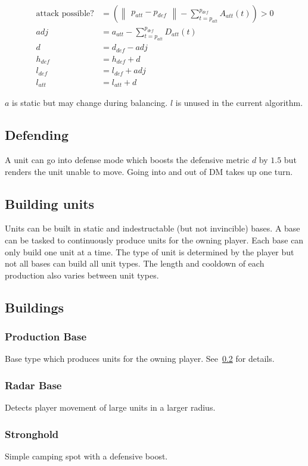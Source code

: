 \begin{align}
    \text{attack possible?} &= (\begin{Vmatrix}p_{att} - p_{def}\end{Vmatrix} - \sum_{t=p_{att}}^{p_{def}} A_{att}(t)) > 0 \\
    adj &= a_{att} - \sum_{t=p_{att}}^{p_{def}} D_{att}(t) \\
    d &= d_{def} - adj \\
    h_{def} &= h_{def} + d \\
    l_{def} &= l_{def} + adj \\
    l_{att} &= l_{att} + d
\end{align}

$a$ is static but may change during balancing. $l$ is unused in the current algorithm.
\subsection{Defending}
A unit  can go into defense mode which boosts the defensive metric $d$ by $1.5$ but renders the unit  unable to move.
Going into and out of DM takes up one turn.
\subsection{Building units }
\label{building units}
Units can be built in static and indestructable (but not invincible) bases.
A base can be tasked to continuously produce units  for the owning player. Each base can only build one unit 
at a time. The type of unit  is determined by the player but not all bases can build all unit  types. The length and cooldown
of each production also varies between unit  types.
\subsection{Buildings}
\subsubsection{Production Base}
Base type which produces units  for the owning player. See~\ref{building units} for details.
\subsubsection{Radar Base}
Detects player movement of large units in a larger radius.
\subsubsection{Stronghold}
Simple camping spot with a defensive boost.
